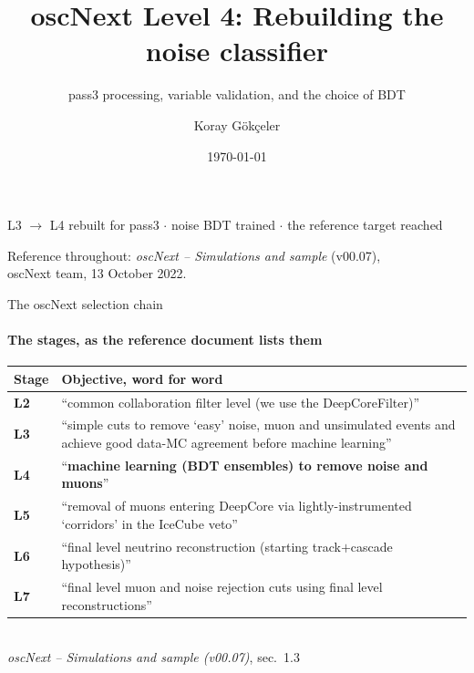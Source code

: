 \documentclass[aspectratio=169,10pt]{beamer}
\title{oscNext Level 4: Rebuilding the noise classifier}
\subtitle{pass3 processing, variable validation, and the choice of BDT}
\author{Koray Gökçeler}
\date{\today}
\newcommand{\notetitle}{oscNext -- Simulations and sample (v00.07)}
\newcommand{\notecite}[1]{{\tiny\color{gray}\textit{\notetitle}, #1}}
\begin{document}
\begin{frame}[plain]
  \titlepage
  \begin{center}\small
  L3 $\to$ L4 rebuilt for pass3 \quad$\cdot$\quad
  noise BDT trained \quad$\cdot$\quad
  the reference target reached
  \end{center}
  \vfill
  \begin{center}\scriptsize\color{gray}
  Reference throughout: \emph{oscNext -- Simulations and sample} (v00.07),\\
  oscNext team, 13 October 2022.
  \end{center}
\end{frame}

\begin{frame}{The oscNext selection chain}
  \framesubtitle{The stages, as the reference document lists them}
  \centering\scriptsize
  \begin{tabular}{@{}>{\raggedright\arraybackslash}p{1.1cm}%
                    >{\raggedright\arraybackslash}p{12.5cm}@{}}
    \toprule
    \textbf{Stage} & \textbf{Objective, word for word} \\
    \midrule
    \textbf{L2} & ``common collaboration filter level (we use the
                   DeepCoreFilter)'' \\[2pt]
    \textbf{L3} & ``simple cuts to remove `easy' noise, muon and unsimulated
                   events and achieve good data-MC agreement before machine
                   learning'' \\[2pt]
    \textbf{\textcolor{bad}{L4}} &
                  ``\textbf{machine learning (BDT ensembles) to remove noise
                   and muons}'' \\[2pt]
    \textbf{L5} & ``removal of muons entering DeepCore via lightly-instrumented
                   `corridors' in the IceCube veto'' \\[2pt]
    \textbf{L6} & ``final level neutrino reconstruction (starting
                   track$+$cascade hypothesis)'' \\[2pt]
    \textbf{L7} & ``final level muon and noise rejection cuts using final level
                   reconstructions'' \\
    \bottomrule
  \end{tabular}\\[3pt]
  \notecite{sec.\ 1.3}


\end{frame}
\end{document}
